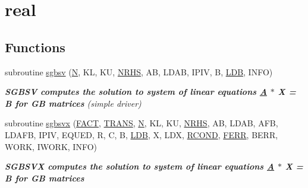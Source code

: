 \hypertarget{group__realGBsolve}{}\section{real}
\label{group__realGBsolve}
\subsection*{Functions}
\begin{DoxyCompactItemize}
\item 
subroutine \hyperlink{group__realGBsolve_ga3656935309a19ed624052103572a4a47}{sgbsv} (\hyperlink{polmisc_8c_a0240ac851181b84ac374872dc5434ee4}{N}, K\+L, K\+U, \hyperlink{example__user_8c_aa0138da002ce2a90360df2f521eb3198}{N\+R\+H\+S}, A\+B, L\+D\+A\+B, I\+P\+I\+V, B, \hyperlink{example__user_8c_a50e90a7104df172b5a89a06c47fcca04}{L\+D\+B}, I\+N\+F\+O)
\begin{DoxyCompactList}\small\item\em {\bfseries  S\+G\+B\+S\+V computes the solution to system of linear equations \hyperlink{classA}{A} $\ast$ X = B for G\+B matrices} (simple driver) \end{DoxyCompactList}\item 
subroutine \hyperlink{group__realGBsolve_gae509be897c5d8dc6885d2b5f13ec2e4a}{sgbsvx} (\hyperlink{superlu__enum__consts_8h_af00a42ecad444bbda75cde1b64bd7e72a1b6692b56d378abb85bd49063721d034}{F\+A\+C\+T}, \hyperlink{superlu__enum__consts_8h_a0c4e17b2d5cea33f9991ccc6a6678d62a1f61e3015bfe0f0c2c3fda4c5a0cdf58}{T\+R\+A\+N\+S}, \hyperlink{polmisc_8c_a0240ac851181b84ac374872dc5434ee4}{N}, K\+L, K\+U, \hyperlink{example__user_8c_aa0138da002ce2a90360df2f521eb3198}{N\+R\+H\+S}, A\+B, L\+D\+A\+B, A\+F\+B, L\+D\+A\+F\+B, I\+P\+I\+V, E\+Q\+U\+E\+D, R, C, B, \hyperlink{example__user_8c_a50e90a7104df172b5a89a06c47fcca04}{L\+D\+B}, X, L\+D\+X, \hyperlink{superlu__enum__consts_8h_af00a42ecad444bbda75cde1b64bd7e72a9b5c151728d8512307565994c89919d5}{R\+C\+O\+N\+D}, \hyperlink{superlu__enum__consts_8h_af00a42ecad444bbda75cde1b64bd7e72a78fd14d7abebae04095cfbe02928f153}{F\+E\+R\+R}, B\+E\+R\+R, W\+O\+R\+K, I\+W\+O\+R\+K, I\+N\+F\+O)
\begin{DoxyCompactList}\small\item\em {\bfseries  S\+G\+B\+S\+V\+X computes the solution to system of linear equations \hyperlink{classA}{A} $\ast$ X = B for G\+B matrices} \end{DoxyCompactList}\item 

\end{DoxyCompactItemize}
